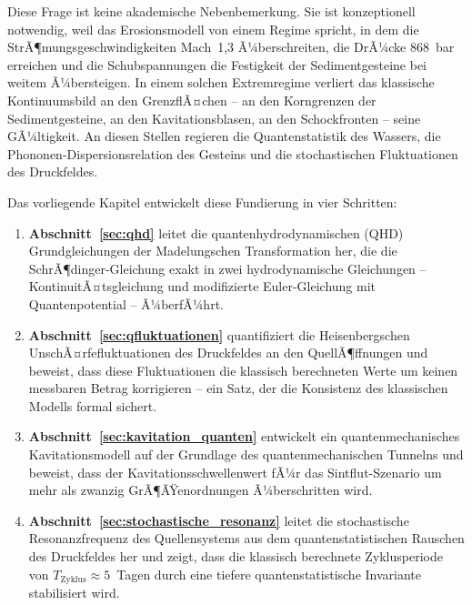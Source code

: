 ﻿\documentclass[12pt,a4paper]{report}
\begin{document}
\begin{center}
\end{center}

Diese Frage ist keine akademische Nebenbemerkung. Sie ist konzeptionell notwendig, weil das Erosionsmodell von einem Regime spricht, in dem die StrÃ¶mungsgeschwindigkeiten Mach~1,3 Ã¼berschreiten, die DrÃ¼cke 868~bar erreichen und die Schubspannungen die Festigkeit der Sedimentgesteine bei weitem Ã¼bersteigen. In einem solchen Extremregime verliert das klassische Kontinuumsbild an den GrenzflÃ¤chen -- an den Korngrenzen der Sedimentgesteine, an den Kavitationsblasen, an den Schockfronten -- seine GÃ¼ltigkeit. An diesen Stellen regieren die Quantenstatistik des Wassers, die Phononen-Dispersionsrelation des Gesteins und die stochastischen Fluktuationen des Druckfeldes.

Das vorliegende Kapitel entwickelt diese Fundierung in vier Schritten:

\begin{enumerate}
	\item \textbf{Abschnitt~\ref{sec:qhd}} leitet die quantenhydrodynamischen (QHD) Grundgleichungen der Madelungschen Transformation her, die die SchrÃ¶dinger-Gleichung exakt in zwei hydrodynamische Gleichungen -- KontinuitÃ¤tsgleichung und modifizierte Euler-Gleichung mit Quantenpotential -- Ã¼berfÃ¼hrt.
	
	\item \textbf{Abschnitt~\ref{sec:qfluktuationen}} quantifiziert die Heisenbergschen UnschÃ¤rfefluktuationen des Druckfeldes an den QuellÃ¶ffnungen und beweist, dass diese Fluktuationen die klassisch berechneten Werte um keinen messbaren Betrag korrigieren -- ein Satz, der die Konsistenz des klassischen Modells formal sichert.
	
	\item \textbf{Abschnitt~\ref{sec:kavitation_quanten}} entwickelt ein quantenmechanisches Kavitationsmodell auf der Grundlage des quantenmechanischen Tunnelns und beweist, dass der Kavitationsschwellenwert fÃ¼r das Sintflut-Szenario um mehr als zwanzig GrÃ¶ÃŸenordnungen Ã¼berschritten wird.
	
	\item \textbf{Abschnitt~\ref{sec:stochastische_resonanz}} leitet die stochastische Resonanzfrequenz des Quellensystems aus dem quantenstatistischen Rauschen des Druckfeldes her und zeigt, dass die klassisch berechnete Zyklusperiode von $T_\mathrm{Zyklus} \approx 5$~Tagen durch eine tiefere quantenstatistische Invariante stabilisiert wird.
\end{enumerate}
\end{document}
